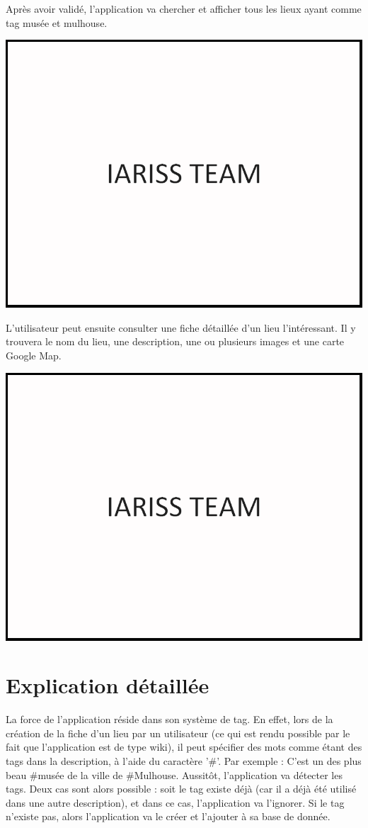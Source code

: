\documentclass[12pt, a4paper]{article}
\newcommand{\espace}{\vspace{.8cm}}
\begin{document}
\espace{}
Après avoir validé, l'application va chercher et afficher tous les lieux ayant comme tag \og{}musée\fg{} et \og{}mulhouse\fg{}.

\espace{}
\includegraphics[width=.9\textwidth, keepaspectratio=true]{img/test.png}

\espace{}
L'utilisateur peut ensuite consulter une fiche détaillée d'un lieu l'intéressant. Il y trouvera le nom du lieu, une description, une ou plusieurs images et une carte Google Map.

\espace{}
\includegraphics[width=.9\textwidth, keepaspectratio=true]{img/test.png}

\espace{}
\section{Explication détaillée}
La force de l'application réside dans son système de tag. En effet, lors de la création de la fiche d'un lieu par un utilisateur (ce qui est rendu possible par le fait que l'application est de type wiki), il peut spécifier des mots comme étant des tags dans la description, à l'aide du caractère '\#'. Par exemple : \og{}C'est un des plus beau \#musée de la ville de \#Mulhouse\fg{}. Aussitôt, l'application va détecter les tags. Deux cas sont alors possible : soit le tag existe déjà (car il a déjà été utilisé dans une autre description), et dans ce cas, l'application va l'ignorer. Si le tag n'existe pas, alors l'application va le créer et l'ajouter à sa base de donnée.
\end{document}
